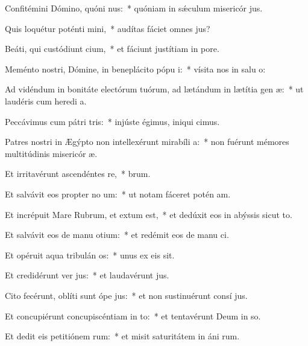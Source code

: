 \item Confitémini Dómino, quóni nus:~* quóniam in sǽculum misericór jus.
\item Quis loquétur poténti mini,~* audítas fáciet omnes  jus?
\item Beáti, qui custódiunt cium,~* et fáciunt justítiam in  pore.
\item Meménto nostri, Dómine, in beneplácito pópu i:~* vísita nos in salu o:
\item Ad vidéndum in bonitáte electórum tuórum, ad lætándum in lætítia gen æ:~* ut laudéris cum heredi a.
\item Peccávimus cum pátri tris:~* injúste égimus, iniqui cimus.
\item Patres nostri in Ægýpto non intellexérunt mirabíli a:~* non fuérunt mémores multitúdinis misericór æ.
\item Et irritavérunt ascendéntes  re,~*  brum.
\item Et salvávit eos propter no um:~* ut notam fáceret potén am.
\item Et incrépuit Mare Rubrum, et extum est,~* et dedúxit eos in abýssis sicut  to.
\item Et salvávit eos de manu otium:~* et redémit eos de manu ci.
\item Et opéruit aqua tribulán os:~* unus ex eis  sit.
\item Et credidérunt ver jus:~* et laudavérunt  jus.
\item Cito fecérunt, oblíti sunt ópe jus:~* et non sustinuérunt consí jus.
\item Et concupiérunt concupiscéntiam in to:~* et tentavérunt Deum in so.
\item Et dedit eis petitiónem rum:~* et misit saturitátem in áni rum.
